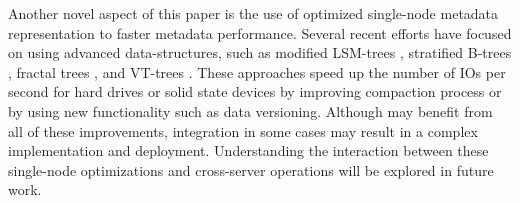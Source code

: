 Another novel aspect of this paper is the use of optimized single-node metadata
representation to faster metadata performance.
Several recent efforts have focused on using advanced data-structures, such
as modified LSM-trees \cite{blsm}, stratified B-trees \cite{Andrew11},
fractal trees \cite{tokufs}, and VT-trees \cite{VTtree}.
These approaches speed up the number of IOs per second for hard drives or solid
state devices by improving compaction process or by using new functionality
such as data versioning. Although \tfs may benefit from all of these
improvements, \giga integration in some cases may result in a complex
implementation and deployment.
Understanding the interaction between these single-node \tfs optimizations and
cross-server operations will be explored in future work.

